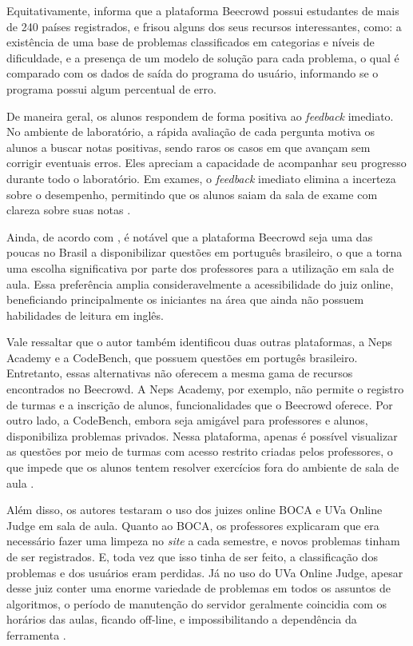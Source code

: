 Equitativamente, \textcite[p.~31]{ferreira2022} informa que a plataforma Beecrowd possui estudantes de mais de 240 países registrados, e frisou alguns dos seus recursos interessantes, como: a existência de uma base de problemas classificados em categorias e níveis de dificuldade, e a presença de um modelo de solução para cada problema, o qual é comparado com os dados de saída do programa do usuário, informando se o programa possui algum percentual de erro. 

De maneira geral, os alunos respondem de forma positiva ao \textit{feedback} imediato. No ambiente de laboratório, a rápida avaliação de cada pergunta motiva os alunos a buscar notas positivas, sendo raros os casos em que avançam sem corrigir eventuais erros. Eles apreciam a capacidade de acompanhar seu progresso durante todo o laboratório. Em exames, o \textit{feedback} imediato elimina a incerteza sobre o desempenho, permitindo que os alunos saiam da sala de exame com clareza sobre suas notas \cite[p.~49]{lobbharlow}. 

Ainda, de acordo com \textcite[p.~24]{lima2023}, é notável que a plataforma Beecrowd seja uma das poucas no Brasil a disponibilizar questões em português brasileiro, o que a torna uma escolha significativa por parte dos professores para a utilização em sala de aula. Essa preferência amplia consideravelmente a acessibilidade do juiz online, beneficiando principalmente os iniciantes na área que ainda não possuem habilidades de leitura em inglês. 

Vale ressaltar que o autor também identificou duas outras plataformas, a Neps Academy e a CodeBench, que possuem questões em portugês brasileiro. Entretanto, essas alternativas não oferecem a mesma gama de recursos encontrados no Beecrowd. A Neps Academy, por exemplo, não permite o registro de turmas e a inscrição de alunos, funcionalidades que o Beecrowd oferece. Por outro lado, a CodeBench, embora seja amigável para professores e alunos, disponibiliza problemas privados. Nessa plataforma, apenas é possível visualizar as questões por meio de turmas com acesso restrito criadas pelos professores, o que impede que os alunos tentem resolver exercícios fora do ambiente de sala de aula \cite[p.~41]{lima2023}. 

Além disso, os autores \textcite[p.~41]{beztonin2012} testaram o uso dos juizes online BOCA e UVa Online Judge em sala de aula. Quanto ao BOCA, os professores explicaram que era necessário fazer uma limpeza no \textit{site} a cada semestre, e novos problemas tinham de ser registrados. E, toda vez que isso tinha de ser feito, a classificação dos problemas e dos usuários eram perdidas. Já no uso do UVa Online Judge, apesar desse juiz conter uma enorme variedade de problemas em todos os assuntos de algoritmos, o período de manutenção do servidor geralmente coincidia com os horários das aulas, ficando off-line, e impossibilitando a dependência da ferramenta \cite[p.~1]{beztonin2012}. 

